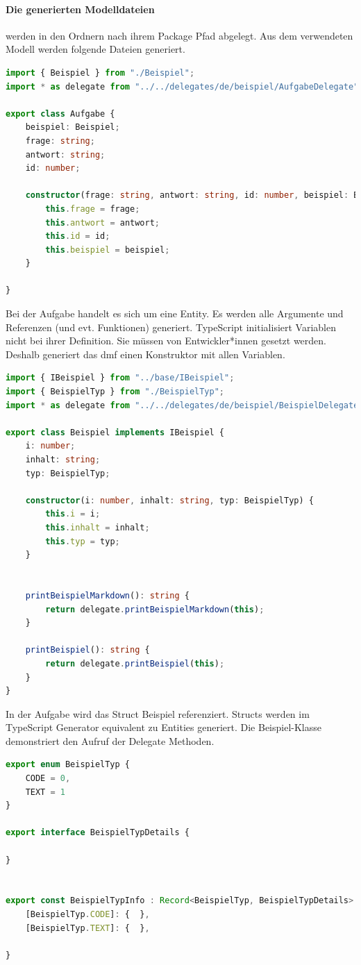 \documentclass[./einleitung.tex]{subfiles}
\begin{document}
    \paragraph{Die generierten Modelldateien} werden in den Ordnern nach ihrem Package Pfad abgelegt.
    Aus dem verwendeten Modell werden folgende Dateien generiert.
    \begin{lstlisting}[language=Typescript,caption=Aufgabe.ts, label=lst:aufgabeTs]
import { Beispiel } from "./Beispiel";
import * as delegate from "../../delegates/de/beispiel/AufgabeDelegate";

export class Aufgabe {
    beispiel: Beispiel;
    frage: string;
    antwort: string;
    id: number;

    constructor(frage: string, antwort: string, id: number, beispiel: Beispiel) {
        this.frage = frage;
        this.antwort = antwort;
        this.id = id;
        this.beispiel = beispiel;
    }

}
    \end{lstlisting}
    Bei der Aufgabe handelt es sich um eine Entity.
    Es werden alle Argumente und Referenzen (und evt. Funktionen) generiert.
    TypeScript initialisiert Variablen nicht bei ihrer Definition.
    Sie müssen von Entwickler*innen gesetzt werden.
    Deshalb generiert das \acrshort{dmf} einen Konstruktor mit allen Variablen.
    \begin{lstlisting}[language=Typescript, caption=Beispiel.ts, label=lst:beispielTs]
import { IBeispiel } from "../base/IBeispiel";
import { BeispielTyp } from "./BeispielTyp";
import * as delegate from "../../delegates/de/beispiel/BeispielDelegate";

export class Beispiel implements IBeispiel {
    i: number;
    inhalt: string;
    typ: BeispielTyp;

    constructor(i: number, inhalt: string, typ: BeispielTyp) {
        this.i = i;
        this.inhalt = inhalt;
        this.typ = typ;
    }


    printBeispielMarkdown(): string {
        return delegate.printBeispielMarkdown(this);
    }

    printBeispiel(): string {
        return delegate.printBeispiel(this);
    }
}
    \end{lstlisting}
    In der Aufgabe wird das Struct Beispiel referenziert.
    Structs werden im TypeScript Generator equivalent zu Entities generiert.
    Die Beispiel-Klasse demonstriert den Aufruf der Delegate Methoden.
    \begin{lstlisting}[language=Typescript, caption=BeispielTyp.ts, label=lst:beispielTypTs]
export enum BeispielTyp {
    CODE = 0,
    TEXT = 1
}

export interface BeispielTypDetails {

}


export const BeispielTypInfo : Record<BeispielTyp, BeispielTypDetails> = {
    [BeispielTyp.CODE]: {  },
    [BeispielTyp.TEXT]: {  },

}
    \end{lstlisting}
\end{document}
